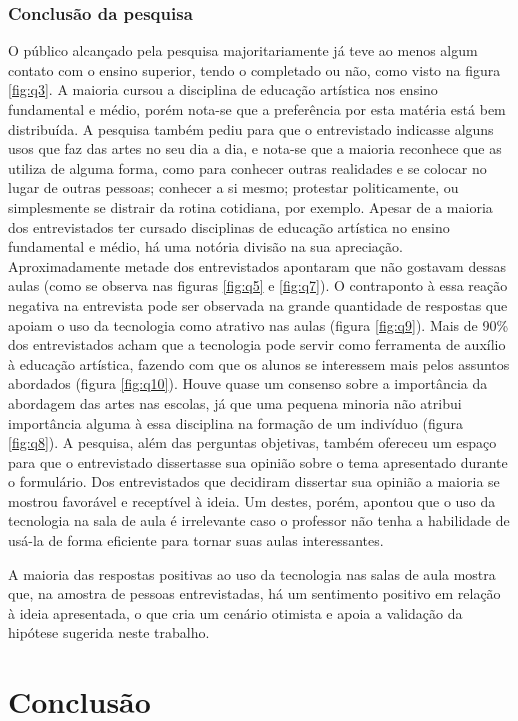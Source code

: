 \documentclass[12pt, a4paper]{article}
\begin{document}
\subsubsection{Conclusão da pesquisa}
O público alcançado pela pesquisa majoritariamente já teve ao menos algum contato com o ensino superior, tendo o completado ou não, como visto na figura \ref{fig:q3}. A maioria cursou a disciplina de educação artística nos ensino fundamental e médio, porém nota-se que a preferência por esta matéria está bem distribuída. A pesquisa também pediu para que o entrevistado indicasse alguns usos que faz das artes no seu dia a dia, e nota-se que a maioria reconhece que as utiliza de alguma forma, como para conhecer outras realidades e se colocar no lugar de outras pessoas; conhecer a si mesmo; protestar politicamente, ou simplesmente se distrair da rotina cotidiana, por exemplo.
Apesar de a maioria dos entrevistados ter cursado disciplinas de educação artística no ensino fundamental e médio, há uma notória divisão na sua apreciação. Aproximadamente metade dos entrevistados apontaram que não gostavam dessas aulas (como se observa nas figuras \ref{fig:q5} e \ref{fig:q7}).
O contraponto à essa reação negativa na entrevista pode ser observada na grande quantidade de respostas que apoiam o uso da tecnologia como atrativo nas aulas (figura \ref{fig:q9}).
Mais de 90\% dos entrevistados acham que a tecnologia pode servir como ferramenta de auxílio à educação artística, 
fazendo com que os alunos se interessem mais pelos assuntos abordados (figura \ref{fig:q10}). 
Houve quase um consenso sobre a importância da abordagem das artes nas escolas, já que uma pequena minoria não atribui importância alguma à essa disciplina na formação de um indivíduo (figura \ref{fig:q8}). A pesquisa, além das perguntas objetivas, também ofereceu um espaço para que o entrevistado dissertasse sua opinião sobre o tema apresentado durante o formulário. Dos entrevistados que decidiram dissertar sua opinião a maioria se mostrou favorável e receptível à ideia. Um destes, porém, apontou que o uso da tecnologia na sala de aula é irrelevante caso o professor não tenha a habilidade de usá-la de forma eficiente para tornar suas aulas interessantes.

A maioria das respostas positivas ao uso da tecnologia nas salas de aula mostra que, na amostra de pessoas entrevistadas, há um sentimento positivo em relação à ideia apresentada, o que cria um cenário otimista e apoia a validação da hipótese sugerida neste trabalho.

\section{Conclusão}

\newpage
\printbibliography
\end{document}
